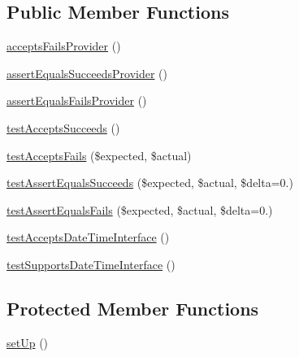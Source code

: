 \subsection*{Public Member Functions}
\begin{DoxyCompactItemize}
\item 
\mbox{\hyperlink{class_sebastian_bergmann_1_1_comparator_1_1_date_time_comparator_test_a9ea19e26cacbca06356c2f229079f8a1}{accepts\+Fails\+Provider}} ()
\item 
\mbox{\hyperlink{class_sebastian_bergmann_1_1_comparator_1_1_date_time_comparator_test_acb6bc1b6e9d32990bdd287f8b590a5fa}{assert\+Equals\+Succeeds\+Provider}} ()
\item 
\mbox{\hyperlink{class_sebastian_bergmann_1_1_comparator_1_1_date_time_comparator_test_a3cc10e39239b6e3f3fda1d34c0fb1c14}{assert\+Equals\+Fails\+Provider}} ()
\item 
\mbox{\hyperlink{class_sebastian_bergmann_1_1_comparator_1_1_date_time_comparator_test_a585e8e34047f506e60cd80f3c3b5373a}{test\+Accepts\+Succeeds}} ()
\item 
\mbox{\hyperlink{class_sebastian_bergmann_1_1_comparator_1_1_date_time_comparator_test_afe5eff1a1b7049f973a035117a7e0df1}{test\+Accepts\+Fails}} (\$expected, \$actual)
\item 
\mbox{\hyperlink{class_sebastian_bergmann_1_1_comparator_1_1_date_time_comparator_test_aad90dcf32f0451135282025c43fb9661}{test\+Assert\+Equals\+Succeeds}} (\$expected, \$actual, \$delta=0.)
\item 
\mbox{\hyperlink{class_sebastian_bergmann_1_1_comparator_1_1_date_time_comparator_test_a8efcbbd3edf65fab391544da6525c167}{test\+Assert\+Equals\+Fails}} (\$expected, \$actual, \$delta=0.)
\item 
\mbox{\hyperlink{class_sebastian_bergmann_1_1_comparator_1_1_date_time_comparator_test_a8d3d76990ef5f5f7b75394bb4c251bc5}{test\+Accepts\+Date\+Time\+Interface}} ()
\item 
\mbox{\hyperlink{class_sebastian_bergmann_1_1_comparator_1_1_date_time_comparator_test_a72bd95f20806d2210b755b82e136ab2e}{test\+Supports\+Date\+Time\+Interface}} ()
\end{DoxyCompactItemize}
\subsection*{Protected Member Functions}
\begin{DoxyCompactItemize}
\item 
\mbox{\hyperlink{class_sebastian_bergmann_1_1_comparator_1_1_date_time_comparator_test_a0bc688732d2b3b162ffebaf7812e78da}{set\+Up}} ()
\end{DoxyCompactItemize}
